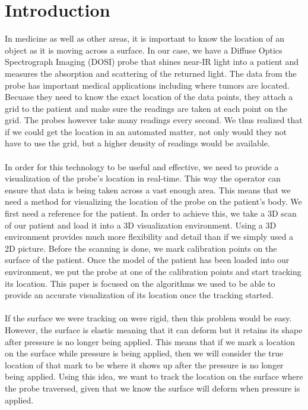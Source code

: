 \section{Introduction}

In medicine as well as other areas, it is important to know the location of an object as it is moving across a surface. In our case, we have a Diffuse Optics Spectrograph Imaging (DOSI) probe that shines near-IR light into a patient and measures the absorption and scattering of the returned light. The data from the probe has important medical applications including where tumors are located. Becuase they need to know the exact location of the data points, they attach a grid to the patient and make sure the readings are taken at each point on the grid. The probes however take many readings every second. We thus realized that if we could get the location in an automated matter, not only would they not have to use the grid, but a higher density of readings would be available. \\
\\
In order for this technology to be useful and effective, we need to provide a visualization of the probe's location in real-time. This way the operator can ensure that data is being taken across a vast enough area. This means that we need a method for visualizing the location of the probe on the patient's body. We first need a reference for the patient. In order to achieve this, we take a 3D scan of our patient and load it into a 3D visualization environment. Using a 3D environment provides much more flexibility and detail than if we simply used a 2D picture. Before the scanning is done, we mark calibration points on the surface of the patient. Once the model of the patient has been loaded into our environment, we put the probe at one of the calibration points and start tracking its location. This paper is focused on the algorithms we used to be able to provide an accurate visualization of its location once the tracking started. \\
\\
If the surface we were tracking on were rigid, then this problem would be easy. However, the surface is elastic meaning that it can deform but it retains its shape after pressure is no longer being applied. This means that if we mark a location on the surface while pressure is being applied, then we will consider the true location of that mark to be where it shows up after the pressure is no longer being applied. Using this idea, we want to track the location on the surface where the probe traversed, given that we know the surface will deform when pressure is applied. \\

